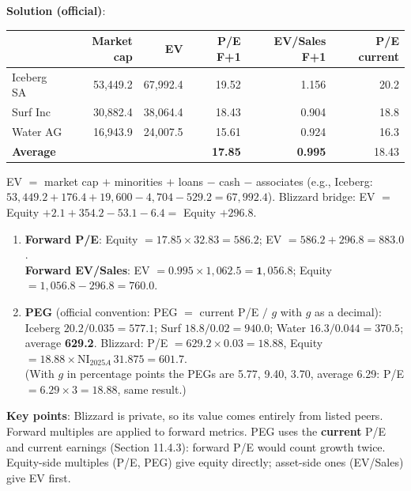 \begin{exbox}
\textbf{Solution (official)}:
\begin{center}
\footnotesize
\begin{tabular}{@{}lrrrrr@{}}
\toprule
 & Market cap & EV & P/E F+1 & EV/Sales F+1 & P/E current\\
\midrule
Iceberg SA & 53,449.2 & 67,992.4 & 19.52 & 1.156 & 20.2\\
Surf Inc & 30,882.4 & 38,064.4 & 18.43 & 0.904 & 18.8\\
Water AG & 16,943.9 & 24,007.5 & 15.61 & 0.924 & 16.3\\
\textbf{Average} & & & \textbf{17.85} & \textbf{0.995} & 18.43\\
\bottomrule
\end{tabular}
\end{center}
EV $=$ market cap $+$ minorities $+$ loans $-$ cash $-$ associates (e.g., Iceberg: $53{,}449.2+176.4+19{,}600-4{,}704-529.2=67{,}992.4$). Blizzard bridge: EV $=$ Equity $+2.1+354.2-53.1-6.4=$ Equity $+296.8$.
\begin{enumerate}[leftmargin=*,label=(\alph*)]
  \item \textbf{Forward P/E}: Equity $=17.85\times32.83=\mathbf{586.2}$; EV $=586.2+296.8=\mathbf{883.0}$.\\
  \textbf{Forward EV/Sales}: EV $=0.995\times1{,}062.5=\mathbf{1{,}056.8}$; Equity $=1{,}056.8-296.8=\mathbf{760.0}$.
  \item \textbf{PEG} (official convention: PEG $=$ current P/E $/$ $g$ with $g$ as a decimal): Iceberg $20.2/0.035=577.1$; Surf $18.8/0.02=940.0$; Water $16.3/0.044=370.5$; average \textbf{629.2}. Blizzard: P/E $=629.2\times0.03=18.88$, Equity $=18.88\times\text{NI}_{2025A}\,31.875=\mathbf{601.7}$.\\
  \footnotesize(With $g$ in percentage points the PEGs are 5.77, 9.40, 3.70, average 6.29: P/E $=6.29\times3=18.88$, same result.)\normalsize
\end{enumerate}
\textbf{Key points}: Blizzard is private, so its value comes entirely from listed peers. Forward multiples are applied to forward metrics. PEG uses the \textbf{current} P/E and current earnings (Section 11.4.3): forward P/E would count growth twice. Equity-side multiples (P/E, PEG) give equity directly; asset-side ones (EV/Sales) give EV first.
\end{exbox}

